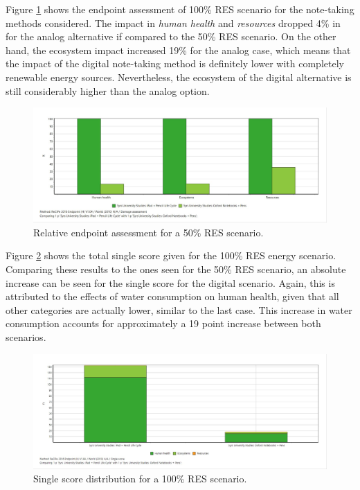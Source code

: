 Figure \ref{fig:damage_assessment_RES_100} shows the endpoint assessment of 100\% RES scenario for the note-taking methods considered. The impact in \textit{human health} and \textit{resources} dropped 4\% in for the analog alternative if compared to the 50\% RES scenario. On the other hand, the ecosystem impact increased 19\% for the analog case, which means that the impact of the digital note-taking method is definitely lower with completely renewable energy sources. Nevertheless, the ecosystem of the digital alternative is still considerably higher than the analog option. 

\begin{figure}[H]
    \centering
    \includegraphics[width=\textwidth]{images/RES_100/Damage_Assessment_RES_100.JPG}
    \caption{Relative endpoint assessment for a 50\% RES scenario.}\label{fig:damage_assessment_RES_100}
\end{figure}

Figure \ref{fig:single_score_RES100} shows the total single score given for the 100\% RES energy scenario. Comparing these results to the ones seen for the 50\% RES scenario, an absolute increase can be seen for the single score for the digital scenario. Again, this is attributed to the effects of water consumption on human health, given that all other categories are actually lower, similar to the last case. This increase in water consumption accounts for approximately a 19 point increase between both scenarios. 

\begin{figure}[H]
    \centering
    \includegraphics[width=\textwidth]{images/RES_100/Single_Score_RES_100.JPG}
    \caption{Single score distribution for a 100\% RES scenario.}\label{fig:single_score_RES100}
\end{figure}